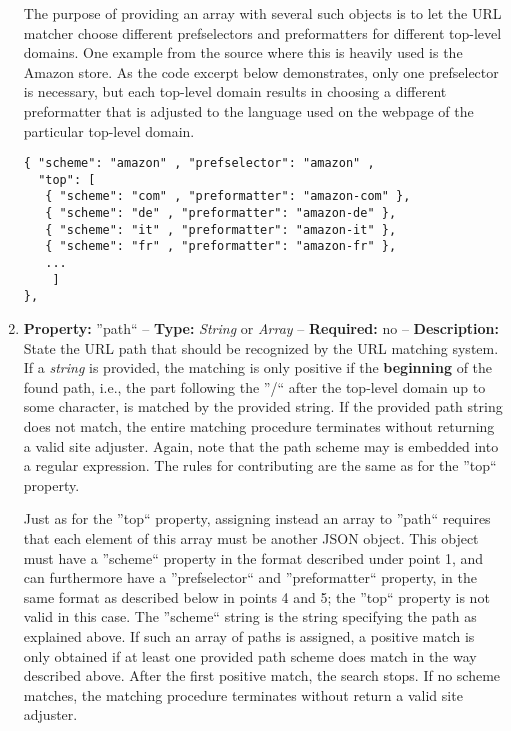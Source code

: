 \documentclass[
a4paper,
12pt,
]
{article}
\begin{document}
\begin{enumerate}
  The purpose of providing an array with several such objects is to let the URL matcher choose different prefselectors and preformatters for different top-level domains. One example from the source where this is heavily used is the Amazon store. As the code excerpt  below demonstrates, only one prefselector is necessary, but each top-level domain results in choosing a different preformatter that is adjusted to the language used on the webpage of the particular top-level domain.
   \begin{center}
\begin{lstlisting}
{ "scheme": "amazon" , "prefselector": "amazon" ,
  "top": [
   { "scheme": "com" , "preformatter": "amazon-com" },
   { "scheme": "de" , "preformatter": "amazon-de" },
   { "scheme": "it" , "preformatter": "amazon-it" },
   { "scheme": "fr" , "preformatter": "amazon-fr" },
   ...
	]
},
\end{lstlisting}
\end{center}

 \item \textbf{Property:} ''path`` -- \textbf{Type:} \textit{String} or \textit{Array} -- \textbf{Required:} no -- \textbf{Description:} State the URL path that should be recognized by the URL matching system. If a \textit{string} is provided, the matching is only positive if the \textbf{beginning} of the found path, i.e., the part following the ''/`` after the top-level domain up to some character, is matched by the provided string. If the provided path string does not match, the entire matching procedure terminates without returning a valid site adjuster.
 Again, note that the path scheme may is embedded into a regular expression. The rules for contributing are the same as for the ''top`` property.\par
  
  Just as for the ''top`` property, assigning instead an array to ''path`` requires that each element of this array must be another JSON object. This object must have a ''scheme`` property in the format described under point 1, and can furthermore have a ''prefselector`` and ''preformatter`` property, in the same format as described below in points 4 and 5; the ''top`` property is not valid in this case. 
  The ''scheme`` string is the string specifying the path as explained above. If such an array of paths is assigned, a positive match is only obtained if at least one provided path scheme does match in the way described above. After the first positive match, the search stops. If no scheme matches, the matching procedure terminates without return a valid site adjuster.\par
  

\end{enumerate}
\end{document}
